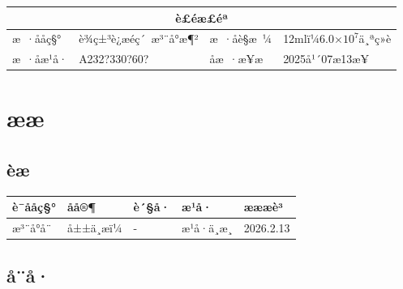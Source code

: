 \documentclass[UTF8,10pt,a4paper,fontset=fandol]{ctexart}
\newcommand{\fieldvalue}[1]{#1}
\newcommand{\handwritten}[1]{#1}
\begin{document}
\begin{center}
\begin{tabular}{|p{}|p{}|p{}|p{}|}
\hline
\multicolumn{4}{|c|}{è£éæ£éª}\\
\hline
æ ·ååç§° & è¾ç±³è¿æéç´ æ³¨å°æ¶² & æ ·åè§æ ¼ & 12mlï¼6.0$\times 10^{7}$ä¸ªç»è\\
\hline
æ ·åæ¹å· &
\fieldvalue{\handwritten{A232?330?60?}} &
åæ ·æ¥æ &
\fieldvalue{\handwritten{2025å¹´07æ13æ¥}}\\
\hline
\end{tabular}
\end{center}

\section{ææ}

\subsection{èæ}

\begin{center}
\begin{tabular}{|p{}|p{}|p{}|p{}|p{}|}
\hline
è¯ååç§° & åå®¶ & è´§å· & æ¹å· & æææè³\\
\hline
æ³¨å°å¨ &
\fieldvalue{\handwritten{å±±ä¸æï¼}} &
\fieldvalue{\handwritten{-}} &
\fieldvalue{\handwritten{æ¹å·ä¸æ¸}} &
\fieldvalue{\handwritten{2026.2.13}}\\
\hline
\end{tabular}
\end{center}

\subsection{å¨å·}
\end{document}
